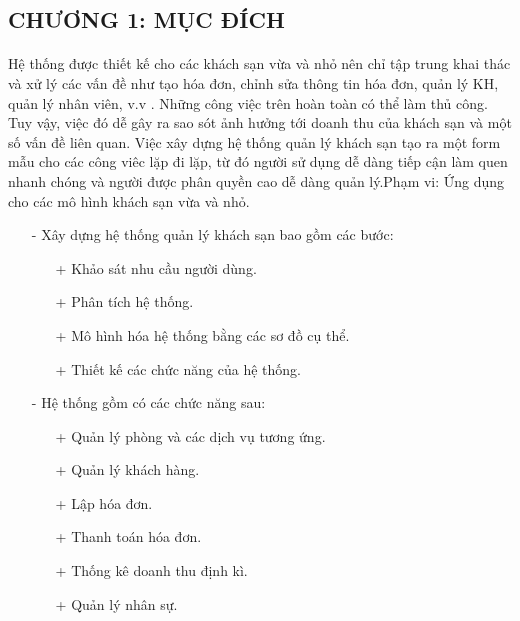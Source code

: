 \documentclass{article}
\begin{document}
	\begin{flushleft}
		
		\fontsize{16}{20}\selectfont
		\section*{CHƯƠNG 1: MỤC ĐÍCH}
		\fontsize{13}{13}\selectfont
		\paragraph{}
        Hệ thống được thiết kế cho các khách sạn vừa và nhỏ nên chỉ tập trung khai thác và xử lý các vấn đề như tạo hóa đơn, chỉnh sửa thông tin hóa đơn, quản lý KH, quản lý nhân viên, v.v . Những công việc trên hoàn toàn có thể làm thủ công. Tuy vậy, việc đó dễ gây ra sao sót ảnh hưởng tới doanh thu của khách sạn và một số vấn đề liên quan. Việc xây dựng hệ thống quản lý khách sạn tạo ra một form mẫu cho các công viêc lặp đi lặp, từ đó người sử dụng dễ dàng tiếp cận làm quen nhanh chóng và người được phân quyền cao dễ dàng quản lý.Phạm vi: Ứng dụng cho các mô hình khách sạn vừa và nhỏ.
	\pagebreak
		\begin{itemize}
			\item[-] Xây dựng hệ thống quản lý khách sạn bao gồm các bước:
			\begin{itemize}
				\item[+]Khảo sát nhu cầu người dùng.
				\item[+]Phân tích hệ thống.
				\item[+]Mô hình hóa hệ thống bằng các sơ đồ cụ thể.
				\item[+]Thiết kế các chức năng của hệ thống.
			\end{itemize}
		\end{itemize}	
			\begin{itemize}
			\item[-]Hệ thống gồm có các chức năng sau:
			\begin{itemize}
				\item[+]Quản lý phòng và các dịch vụ tương ứng.
				\item[+]Quản lý khách hàng.
				\item[+]Lập hóa đơn.
				\item[+]Thanh toán hóa đơn.
				\item[+]Thống kê doanh thu định kì.
				\item[+]Quản lý nhân sự.
			\end{itemize}
		\end{itemize}	
		

\end{flushleft}
\end{document}
